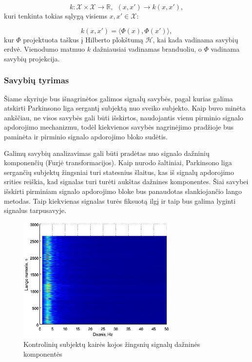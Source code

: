 \documentclass[]{vgtuef}
\begin{document}
\begin{equation}
  k: \mathcal{X} \times \mathcal{X} \rightarrow \mathbb{R}, ~~ (x,x')
  \rightarrow k(x,x'),
\end{equation}
kuri tenkinta tokias sąlygą visiems $x,x' \in \mathcal{X}$:

\begin{equation}
  k(x,x') = \langle \Phi(x), \Phi(x') \rangle,
\end{equation}
kur $\Phi$ projektuota taškus į Hilberto plokštumą $\mathcal{H}$, kai kada vadinama savybių erdvė. Vienodumo matmuo $k$ dažniausiai vadinamas branduoliu, o $\Phi$ vadinama savybių projekcija.

\subsubsection{Savybių tyrimas}

Šiame skyriuje bus išnagrinėtos galimos signalų savybės, pagal kurias galima atskirti Parkinsono liga sergantį subjektą nuo sveiko subjekto. Kaip buvo minėta ankščiau, ne visos savybės gali būti išskirtos, naudojantis vienu pirminio signalo apdorojimo mechanizmu, todėl kiekvienos savybės nagrinėjimo pradžioje bus paminėta ir pirminio signalo apdorojimo bloko sudėtis.


Galimų savybių analizavimas gali būti pradėtas nuo signalo dažninių komponenčių (Furjė transformacijos). Kaip nurodo šaltiniai,  Parkinsono liga sergančių subjektų žingsniai turi statesnius šlaitus, kas iš signalų apdorojimo srities reiškia, kad signalas turi turėti aukštas dažnines komponentes. Šiai savybei išskirti pirminiam signalo apdorojimo bloke bus panaudotas slankiojančio lango metodas. Taip kiekvienas signalas turės fiksuotą ilgį ir taip bus galima lyginti signalus tarpusavyje.

\begin{figure}[!t]
  \centering
  \includegraphics[width=300px]{figures/co_fft.eps}
  \caption{Kontrolinių subjektų kairės kojos žingsnių signalų dažninės
  komponentės}
  \label{fig:co_fft}
\end{figure}
\end{document}
